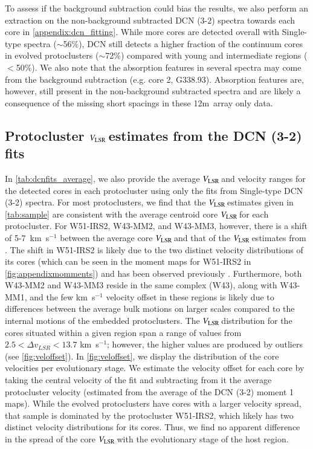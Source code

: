 \documentclass[longauth]{aa} %
\newcommand{\vlsr}{\mbox{$V_{\rm LSR}$\,}}
\newcommand{\kms}{\textrm{km~s}\ensuremath{^{-1}}\xspace}       %
\begin{document}
To assess if the background subtraction could bias the results, we also perform an extraction on the non-background subtracted DCN (3-2) spectra towards each core in \cref{appendix:dcn_fitting}. While more cores are detected overall with Single-type spectra ($\sim$56\%), DCN still detects a higher fraction of the continuum cores in  evolved protoclusters ($\sim$72\%) compared with young and intermediate regions ($<$50\%). We also note that the absorption features in several spectra may come from the background subtraction (e.g. core 2, G338.93). Absorption features are, however, still present in the non-background subtracted spectra and are likely a consequence of the missing short spacings in these 12m~array only data. 



\subsection{Protocluster \vlsr estimates from the DCN (3-2) fits}

In \cref{tab:dcnfits_average}, we also provide the average \vlsr and velocity ranges for the detected cores in each protocluster using only the fits from Single-type DCN (3-2) spectra. For most protoclusters, we find that the \vlsr estimates given in \cref{tab:sample} \citep{Motte2022} are consistent with the average centroid core \vlsr for each protocluster. For W51-IRS2, W43-MM2, and W43-MM3, however, there is a shift of 5-7~\kms between the average core \vlsr and that of the \vlsr estimates from \citet{Motte2022}. The shift in W51-IRS2 is likely due to the two distinct velocity distributions of its cores (which can be seen in the moment maps for W51-IRS2 in \cref{fig:appendixmomments}) and has been observed previously \citep{ginsburg15}. Furthermore, both W43-MM2 and W43-MM3 reside in the same complex (W43), along with W43-MM1, and the few \kms velocity offset in these regions is likely due to differences between the average bulk motions on larger scales compared to the internal motions of the embedded protoclusters. The \vlsr distribution for the cores situated within a given region span a range of values from $2.5<\Delta v_{LSR} < 13.7$ \kms; however, the higher values are produced by outliers (see \cref{fig:veloffset}).
In \cref{fig:veloffset}, we display the distribution of the core velocities per evolutionary stage. We estimate the velocity offset for each core by taking the central velocity of the fit and subtracting from it the average protocluster velocity (estimated from the average of the DCN (3-2) moment 1 maps). While the evolved protoclusters have cores with a larger velocity spread, that sample is dominated by the protocluster W51-IRS2, which likely has two distinct velocity distributions for its cores. Thus, we find no apparent difference in the spread of the core \vlsr with the evolutionary stage of the host region.
\end{document}

